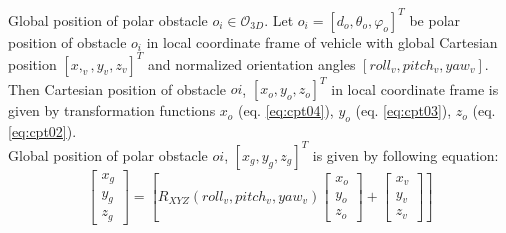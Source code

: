 \begin{definition}{Global position of polar obstacle $o_i\in\mathscr{O}_{3D}$.}\label{def:globalObstaclePosition3D}
    Let $o_i = [d_o, \theta_o, \varphi_o]^T$ be polar position of obstacle $o_i$ in local coordinate frame of vehicle with global Cartesian position $[x,_v,y_v,z_v]^T$ and normalized orientation angles $[roll_v,pitch_v,yaw_v]$.\\
    Then Cartesian position of obstacle $oi$, $[x_o,y_o,z_o]^T$  in local coordinate frame is given by transformation functions $x_o$ (eq. \ref{eq:cpt04}), $y_o$ (eq. \ref{eq:cpt03}), $z_o$ (eq. \ref{eq:cpt02}).\\ 
    Global  position of polar obstacle $oi$, $[x_g,y_g,z_g]^T$ is given by following equation:
    \begin{equation}
        \begin{bmatrix}
            x_g\\y_g\\z_g
        \end{bmatrix}
        =
        \left [
            R_{XYZ}(roll_v,pitch_v,yaw_v)
            \begin{bmatrix}
                x_o\\y_o\\z_o
            \end{bmatrix}
            +
            \begin{bmatrix}
                x_v\\y_v\\z_v
            \end{bmatrix}
        \right ]
    \end{equation}    
\end{definition}

